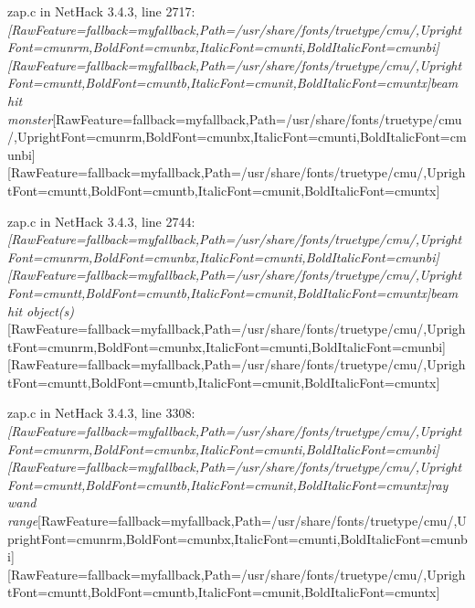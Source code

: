 \begin{myenumerate}
\item{} zap.c in NetHack 3.4.3, line 2717\footnotemark[205]: {\itshape \allowbreak{}\setmainfont{cmunti.ttf}[RawFeature={fallback=myfallback},Path=/usr/share/fonts/truetype/cmu/,UprightFont=cmunrm,BoldFont=cmunbx,ItalicFont=cmunti,BoldItalicFont=cmunbi]\setmonofont{cmunti.ttf}[RawFeature={fallback=myfallback},Path=/usr/share/fonts/truetype/cmu/,UprightFont=cmuntt,BoldFont=cmuntb,ItalicFont=cmunit,BoldItalicFont=cmuntx]\itshape beam hit monster}\allowbreak{}\setmainfont{cmunrm.ttf}[RawFeature={fallback=myfallback},Path=/usr/share/fonts/truetype/cmu/,UprightFont=cmunrm,BoldFont=cmunbx,ItalicFont=cmunti,BoldItalicFont=cmunbi]\setmonofont{cmunrm.ttf}[RawFeature={fallback=myfallback},Path=/usr/share/fonts/truetype/cmu/,UprightFont=cmuntt,BoldFont=cmuntb,ItalicFont=cmunit,BoldItalicFont=cmuntx]
     

\item{} zap.c in NetHack 3.4.3, line 2744\footnotemark[206]: {\itshape \allowbreak{}\setmainfont{cmunti.ttf}[RawFeature={fallback=myfallback},Path=/usr/share/fonts/truetype/cmu/,UprightFont=cmunrm,BoldFont=cmunbx,ItalicFont=cmunti,BoldItalicFont=cmunbi]\setmonofont{cmunti.ttf}[RawFeature={fallback=myfallback},Path=/usr/share/fonts/truetype/cmu/,UprightFont=cmuntt,BoldFont=cmuntb,ItalicFont=cmunit,BoldItalicFont=cmuntx]\itshape beam hit object(s)}\allowbreak{}\setmainfont{cmunrm.ttf}[RawFeature={fallback=myfallback},Path=/usr/share/fonts/truetype/cmu/,UprightFont=cmunrm,BoldFont=cmunbx,ItalicFont=cmunti,BoldItalicFont=cmunbi]\setmonofont{cmunrm.ttf}[RawFeature={fallback=myfallback},Path=/usr/share/fonts/truetype/cmu/,UprightFont=cmuntt,BoldFont=cmuntb,ItalicFont=cmunit,BoldItalicFont=cmuntx]
     

\item{} zap.c in NetHack 3.4.3, line 3308\footnotemark[207]: {\itshape \allowbreak{}\setmainfont{cmunti.ttf}[RawFeature={fallback=myfallback},Path=/usr/share/fonts/truetype/cmu/,UprightFont=cmunrm,BoldFont=cmunbx,ItalicFont=cmunti,BoldItalicFont=cmunbi]\setmonofont{cmunti.ttf}[RawFeature={fallback=myfallback},Path=/usr/share/fonts/truetype/cmu/,UprightFont=cmuntt,BoldFont=cmuntb,ItalicFont=cmunit,BoldItalicFont=cmuntx]\itshape ray wand range}\allowbreak{}\setmainfont{cmunrm.ttf}[RawFeature={fallback=myfallback},Path=/usr/share/fonts/truetype/cmu/,UprightFont=cmunrm,BoldFont=cmunbx,ItalicFont=cmunti,BoldItalicFont=cmunbi]\setmonofont{cmunrm.ttf}[RawFeature={fallback=myfallback},Path=/usr/share/fonts/truetype/cmu/,UprightFont=cmuntt,BoldFont=cmuntb,ItalicFont=cmunit,BoldItalicFont=cmuntx]
     


\end{myenumerate}
